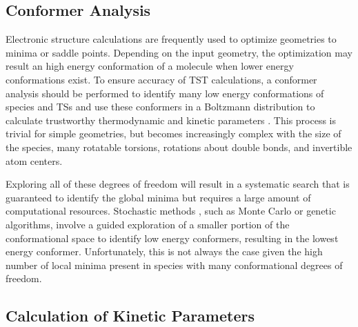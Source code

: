 \documentclass[preprint, 11pt]{elsarticle} %
\begin{document}

\subsection{Conformer Analysis}

Electronic structure calculations are frequently used to optimize geometries to minima or saddle points. 
Depending on the input geometry, the optimization may result an high energy conformation of a molecule when lower energy conformations exist. 
To ensure accuracy of TST calculations, a conformer analysis should be performed to identify many low energy conformations of species and TSs and use these conformers in a Boltzmann distribution to calculate trustworthy thermodynamic and kinetic parameters \cite{Allen:1993, Csaszar:1998}.
This process is trivial for simple geometries, but becomes increasingly complex with the size of the species, many rotatable torsions, rotations about double bonds, and invertible atom centers.

Exploring all of these degrees of freedom will result in a systematic search that is guaranteed to identify the global minima but requires a large amount of computational resources.
Stochastic methods \cite{Ebejer:2012}, such as Monte Carlo or genetic algorithms, involve a guided exploration of a smaller portion of the conformational space to identify low energy conformers, resulting in the lowest energy conformer.
Unfortunately, this is not always the case given the high number of local minima present in species with many conformational degrees of freedom.
\subsection{Calculation of Kinetic Parameters}
\end{document}

